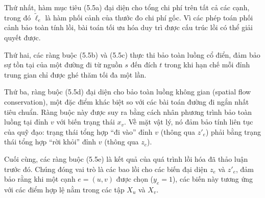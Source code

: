 Thứ nhất, hàm mục tiêu (5.5a) đại diện cho tổng chi phí trên tất cả các cạnh, trong đó $\tilde{\ell}_e$ là hàm phối cảnh của thước đo chi phí gốc. Vì các phép toán phối cảnh bảo toàn tính lồi, bài toán tối ưu hóa duy trì được cấu trúc lồi có thể giải quyết được.

Thứ hai, các ràng buộc (5.5b) và (5.5c) thực thi bảo toàn luồng cổ điển, đảm bảo sự tồn tại của một đường đi từ nguồn $s$ đến đích $t$ trong khi hạn chế mỗi đỉnh trung gian chỉ được ghé thăm tối đa một lần.

Thứ ba, ràng buộc (5.5d) đại diện cho bảo toàn luồng không gian (spatial flow conservation), một đặc điểm khác biệt so với các bài toán đường đi ngắn nhất tiêu chuẩn. Ràng buộc này được suy ra bằng cách nhân phương trình bảo toàn luồng tại đỉnh $v$ với biến trạng thái $x_v$. Về mặt vật lý, nó đảm bảo tính liên tục của quỹ đạo: trạng thái tổng hợp ``đi vào'' đỉnh $v$ (thông qua $z'_e$) phải bằng trạng thái tổng hợp ``rời khỏi'' đỉnh $v$ (thông qua $z_e$).

Cuối cùng, các ràng buộc (5.5e) là kết quả của quá trình lồi hóa đã thảo luận trước đó. Chúng đóng vai trò là các bao lồi cho các biến đại diện $z_e$ và $z'_e$, đảm bảo rằng khi một cạnh $e=(u,v)$ được chọn ($y_e=1$), các biến này tương ứng với các điểm hợp lệ nằm trong các tập $X_u$ và $X_v$.

